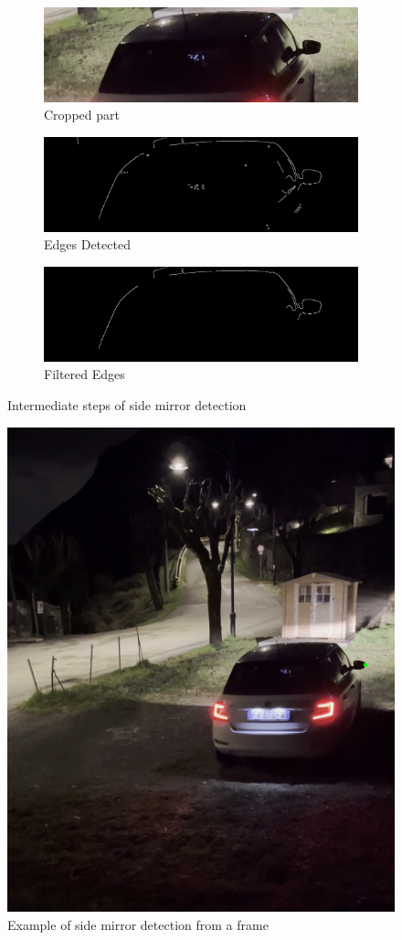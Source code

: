 \begin{figure}[htbhp]
    \centering
    \begin{subfigure}[b]{0.32\textwidth}
        \includegraphics[width=\textwidth]{Images/featureExtractions/MirrorDetection/yolo_frame1.png}
        \caption{Cropped part}
    \end{subfigure}
    \begin{subfigure}[b]{0.32\textwidth}
        \includegraphics[width=\textwidth]{Images/featureExtractions/MirrorDetection/edges.png}
        \caption{Edges Detected}
    \end{subfigure}
    \begin{subfigure}[b]{0.32\textwidth}
        \includegraphics[width=\textwidth]{Images/featureExtractions/MirrorDetection/long_contours.png}
        \caption{Filtered Edges}
    \end{subfigure}

    \caption{Intermediate steps of side mirror detection}
    \label{fig:side-mirror-steps}
\end{figure}

\begin{figure}[htbhp]
    \centering
    \includegraphics[width=0.4\linewidth]{Images/featureExtractions/MirrorDetection/mirror_detected.png}
    \caption{Example of side mirror detection from a frame}
    \label{fig:mirrorDetection}
\end{figure}
